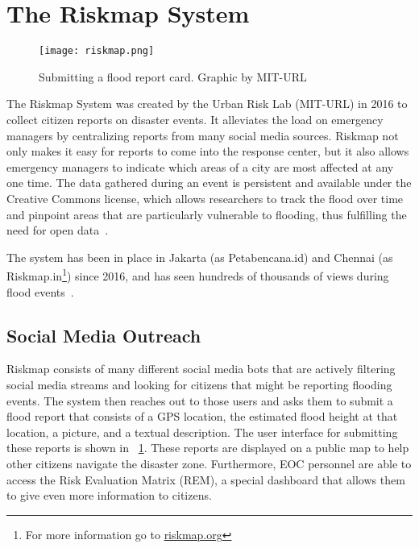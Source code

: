 \section{The Riskmap System}\label{chap2:riskmap}
  \begin{figure}
    \texttt{[image: riskmap.png]}
    \caption{Submitting a flood report card. Graphic by MIT-URL}\label{fig:cards}
  \end{figure}
  The Riskmap System was created by the Urban Risk Lab (MIT-URL) in 2016 to
  collect citizen reports on disaster events. It alleviates the load on
  emergency managers by centralizing reports from many social media
  sources. Riskmap not only makes it easy for reports to come into the
  response center, but it also allows emergency managers to indicate which areas
  of a city are most affected at any one time. The data gathered during an
  event is persistent and available under the Creative Commons license,
  which allows researchers to track the flood over time and pinpoint areas that
  are particularly vulnerable to flooding, thus fulfilling the need
  for open data~\cite{PhilippinesPDCCollaborate,
  antaranews.comBNPBPetaBencanaId}.

  The system has been in place in Jakarta (as Petabencana.id) and Chennai (as
  Riskmap.in\footnote{For more information go to
  \href{http://riskmap.org}{riskmap.org}}) since
  2016, and has seen hundreds of thousands of views during flood
  events~\cite{noveckOpinionElectionsWon2018, oct31ChennaiGetsRain,
  sridharRealtimeFloodMapping2017}.

  \subsection{Social Media Outreach}
  Riskmap consists of many different social media bots that are actively
  filtering social media streams and looking for citizens that might be
  reporting flooding events. The system then reaches out to those users and asks
  them to submit a flood report that consists of a GPS location, the
  estimated flood height at that location, a picture, and a textual
  description. The user interface for submitting these reports is shown
  in \figurename{}~\ref{fig:cards}. These reports are displayed on a public map
  to help other citizens navigate the disaster zone. Furthermore, EOC personnel
  are able to access the Risk Evaluation Matrix (REM), a special dashboard that
  allows them to give even more information to citizens.

